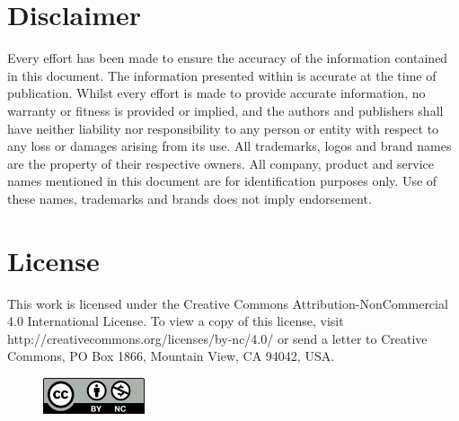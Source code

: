\documentclass[twocolumn]{report}
\newcommand\frontmatter{
	\cleardoublepage
	\pagenumbering{roman}
}
\begin{document}
\frontmatter
{}
\onecolumn\null\vfill

\section*{Disclaimer}
Every effort has been made to ensure the accuracy of the information contained in this document. The information presented within is accurate at the time of publication.  Whilst every effort is made to provide accurate information, no warranty or fitness is provided or implied, and the authors and publishers shall have neither liability nor responsibility to any person or entity with respect to any loss or damages arising from its use.
All trademarks, logos and brand names are the property of their respective owners. All company, product and service names mentioned in this document are for identification purposes only. Use of these names, trademarks and brands does not imply endorsement.

\section*{License}
This work is licensed under the Creative Commons Attribution-NonCommercial 4.0 International License. To view a copy of this license, visit http://creativecommons.org/licenses/by-nc/4.0/ or send a letter to Creative Commons, PO Box 1866, Mountain View, CA 94042, USA.
\begin{figure}[h!]
	\includegraphics[width=3cm]{images/by-nc.png}
\end{figure}
\end{document}
